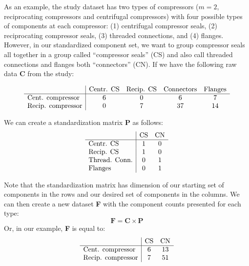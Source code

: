 \documentclass[11pt]{report}
\begin{document}
{{{{As an example, the study dataset has two types of compressors ($m=2$, reciprocating compressors and centrifugal compressors) with four possible types of components at each compressor: (1) centrifugal compressor seals, (2) reciprocating compressor seals, (3) threaded connections, and (4) flanges.  However, in our standardized component set, we want to group compressor seals all together in a group called ``compressor seals'' (CS) and also call threaded connections and flanges both ``connectors'' (CN).  If we have the following raw data $\textbf{C}$ from the study:

\begin{equation}
\begin{array}{l | cccc}
 						&\textrm{Centr. CS}	& \textrm{Recip. CS}	& \textrm{Connectors}	& \textrm{Flanges} \\
						\hline
\textrm{Cent. compressor}		&6			& 0			& 6					& 7 \\
\textrm{Recip. compressor}	&0			& 7			& 37					& 14 \\
\end{array}
\end{equation}

We can create a standardization matrix $\textbf{P}$ as follows:
\begin{equation}
\begin{array}{l | cc}
 			&	\textrm{CS}&	\textrm{CN} \\
				\hline
\textrm{Centr. CS}		&	1 &	0 \\
\textrm{Recip. CS}		&	1&	0 \\
\textrm{Thread. Conn.}	&	0&	1 \\
\textrm{Flanges}		&	0&	1 
\end{array}
\end{equation}

Note that the standardization matrix has dimension of our starting set of components in the rows and our desired set of components in the columns.  We can then create a new dataset \textbf{F} with the component counts presented for each type:
\begin{equation}
\textbf{F} = \textbf{C} \times \textbf{P}
\end{equation}
Or, in our example, \textbf{F} is equal to:
\begin{equation}
\begin{array}{l | cc}
		
 					&	\textrm{CS} &	\textrm{CN} \\
						\hline
\textrm{Cent. compressor} &		6	& 13 \\
\textrm{Recip. compressor} &		7	& 51 \\
\end{array}
\end{equation}


}}}}
\end{document}
